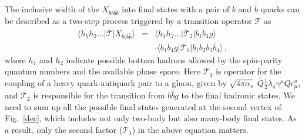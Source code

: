 \documentclass[twocolumn,showpacs,superscriptaddress,preprintnumbers,nofootinbib,prd]{revtex4-1}
\begin{document}
The inclusive width of the $X_{bb\bar{b}\bar{b}}$ into final states with a pair
of $b$ and $\bar b$ quarks can be described as a two-step process triggered by a
transition operator $\mathcal T$ as
\begin{equation}
\begin{array}{rcl}
\langle h_1 h_2\ldots | \mathcal T| X_{bb\bar{b}\bar{b}}\rangle & = & \langle h_1
h_2... | \mathcal T_2| b_1\bar{b}_4 g\rangle \\
& & \cdot \langle b_1\bar{b}_4 g | \mathcal T_1| b_1 b_2 \bar{b}_3\bar{b}_4
\rangle\,,
\end{array}
\label{amp}
\end{equation}
where $h_1$ and $h_2$ indicate possible bottom hadrons allowed by the
spin-parity quantum numbers and the available phase space. Here
$ \mathcal T_1$ is operator for the coupling of a heavy quark-antiquark pair to a
gluon, given by
$\sqrt{4\pi \alpha_s}~\bar{Q} \frac{1}{2} \lambda_a \gamma^{\mu} Q
\epsilon^{a}_{\mu}$, and $\mathcal T_2$ is responsible for the transition from
$b\bar b g $ to the final hadronic states.
We need to sum up all the possible final states generated at
the second vertex of Fig.~\ref{dec}, which includes not only two-body but also many-body final states.
As a result, only the second factor ($\mathcal T_1$) in the above equation matters.
\end{document}
